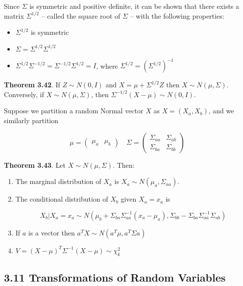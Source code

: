 Since \(\Sigma\) is symmetric and positive definite, it can be shown
that there exists a matrix \(\Sigma^{1/2}\) -- called the square root of
\(\Sigma\) -- with the following properties:

\begin{itemize}[tightlist]
\item
  \(\Sigma^{1/2}\) is symmetric
\item
  \(\Sigma = \Sigma^{1/2} \Sigma^{1/2}\)
\item
  \(\Sigma^{1/2}\Sigma^{-1/2} = \Sigma^{-1/2}\Sigma^{1/2} = I\), where
  \(\Sigma^{1/2} = \left(\Sigma^{1/2}\right)^{-1}\)
\end{itemize}

\textbf{Theorem 3.42}. If \(Z \sim N(0, I)\) and
\(X = \mu + \Sigma^{1/2} Z\) then \(X \sim N(\mu, \Sigma)\). Conversely,
if \(X \sim N(\mu, \Sigma)\), then
\(\Sigma^{-1/2}(X - \mu) \sim N(0, I)\).

Suppose we partition a random Normal vector \(X\) as \(X = (X_a, X_b)\),
and we similarly partition

\[ \mu = \begin{pmatrix}\mu_a & \mu_b \end{pmatrix} 
\quad
\Sigma = \begin{pmatrix}
\Sigma_{aa} & \Sigma_{ab} \\
\Sigma_{ba} & \Sigma_{bb}
\end{pmatrix} \]

\textbf{Theorem 3.43}. Let \(X \sim N(\mu, \Sigma)\). Then:

\begin{enumerate}[label={\arabic*.}]
\item
  The marginal distribution of \(X_a\) is
  \(X_a \sim N(\mu_a, \Sigma_{aa})\).
\item
  The conditional distribution of \(X_b\) given \(X_a = x_a\) is

  \[  X_b | X_a = x_a \sim N \left( \mu_b + \Sigma_{ba}\Sigma_{aa}^{-1}(x_a - \mu_a), \Sigma_{bb} - \Sigma_{ba} \Sigma_{aa}^{-1} \Sigma_{ab} \right) \]
\item
  If \(a\) is a vector then \(a^T X \sim N(a^T \mu, a^T \Sigma a)\)
\item
  \(V = (X - \mu)^T \Sigma^{-1} (X - \mu) \sim \chi_k^2\)
\end{enumerate}

\subsection{3.11 Transformations of Random
Variables}\label{transformations-of-random-variables}

